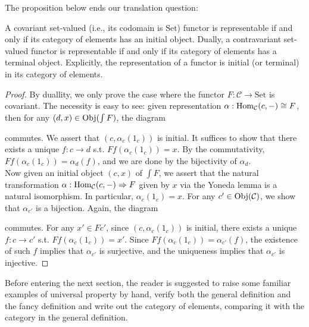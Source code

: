 The proposition below ends our translation question:
\begin{proposition}A covariant set-valued (i.e., its codomain is $\mathrm{Set}$) functor is representable if and only if its category of elements has an initial object. Dually, a contravariant set-valued functor is representable if and only if its category of elements has a terminal object. Explicitly, the representation of a functor is initial (or terminal) in its category of elements.
\end{proposition}
\begin{proof}
By duallity, we only prove the case where the functor $F:\mathcal{C}\to \mathrm{Set}$ is covariant. The necessity is easy to see: given representation $\alpha:\operatorname{Hom}_\mathcal{C}(c,-)\cong F$, then for any $(d,x)\in \operatorname{Obj}(\int F)$, the diagram 
	\begin{center}
	\end{center}
	commutes. We assert that $(c,\alpha_c(1_c))$ is initial. It suffices to show that there exists a unique $f:c\to d$ s.t. $Ff(\alpha_c(1_c))=x$. By the commutativity, $Ff(\alpha_c(1_c))=\alpha_d(f)$, and we are done by the bijectivity of $\alpha_d$.\\
	Now given an initial object $(c,x)$ of $\int F$, we assert that the natural transformation $\alpha:\operatorname{Hom}_\mathcal{C}(c,-)\Rightarrow F$ given by $x$ via the Yoneda lemma is a natural isomorphism. In particular, $\alpha_c(1_c)=x$. For any $c'\in\operatorname{Obj}(\mathcal{C})$, we show that $\alpha_{c'}$ is a bijection. Again, the diagram
	\begin{center}
	\end{center}
	commutes. For any $x'\in Fc'$, since $(c,\alpha_c(1_c))$ is initial, there exists a unique $f:c\to c'$ s.t. $Ff(\alpha_c(1_c))=x'$. Since $Ff(\alpha_c(1_c))=\alpha_{c'}(f)$, the existence of such $f$ implies that $\alpha_{c'}$ is surjective, and the uniqueness implies that $\alpha_{c'}$ is injective.
\end{proof}
Before entering the next section, the reader is suggested to raise some familiar examples of universal property by hand, verify both the general definition and the fancy definition and write out the category of elements, comparing it with the category in the general definition.